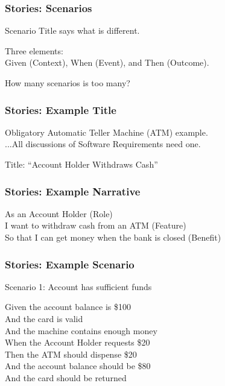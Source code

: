 \begin{frame}
	\frametitle{Stories: Scenarios}
	\begin{changemargin}{1cm}
		Scenario Title says what is different.
		
		Three elements: \\
		\hfill Given (Context), When (Event), and Then (Outcome).
	
		How many scenarios is too many?		
		
	\end{changemargin}
\end{frame}


\begin{frame}
	\frametitle{Stories: Example Title}
	\begin{changemargin}{1cm}
	Obligatory Automatic Teller Machine (ATM) example.\\
		\hfill ...All discussions of Software Requirements need one.
		
	Title: ``Account Holder Withdraws Cash''
				
	\end{changemargin}
\end{frame}

\begin{frame}
	\frametitle{Stories: Example Narrative}
	\begin{changemargin}{1cm}
	
	As an Account Holder (Role)\\
I want to withdraw cash from an ATM (Feature)\\
So that I can get money when the bank is closed (Benefit)
					
	\end{changemargin}
\end{frame}


\begin{frame}
	\frametitle{Stories: Example Scenario}
	\begin{changemargin}{1cm}
	
Scenario 1: Account has sufficient funds

Given the account balance is \$100\\
 And the card is valid\\
 And the machine contains enough money\\
When the Account Holder requests \$20\\
Then the ATM should dispense \$20\\
 And the account balance should be \$80\\
 And the card should be returned
					
	\end{changemargin}
\end{frame}

